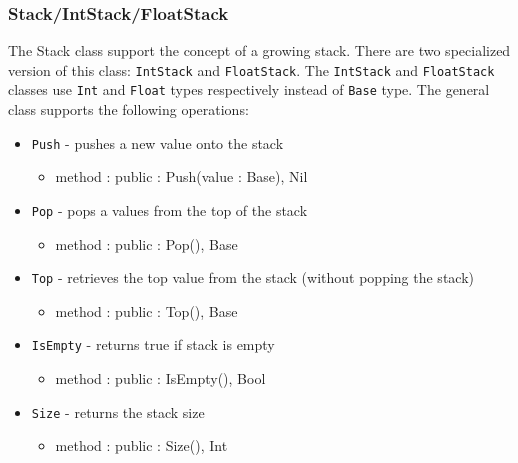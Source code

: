 \documentclass[12pt]{article}
\begin{document}
\subsubsection{Stack/IntStack/FloatStack}
The Stack class support the concept of a growing stack.  There are two specialized version of this class: \texttt{IntStack} and \texttt{FloatStack}.  The \texttt{IntStack} and \texttt{FloatStack} classes use \texttt{Int} and \texttt{Float} types respectively instead of \texttt{Base} type.  The general class supports the following operations:
\begin{itemize}
    \item \texttt{Push} - pushes a new value onto the stack
    	\begin{itemize}
	\item method : public : Push(value : Base), Nil
	\end{itemize}
    \item \texttt{Pop} - pops a values from the top of the stack
    	\begin{itemize}
	\item method : public : Pop(), Base
	\end{itemize}
    \item \texttt{Top} - retrieves the top value from the stack (without popping the stack)
    	\begin{itemize}
	\item method : public : Top(), Base
	\end{itemize}
    \item \texttt{IsEmpty} - returns true if stack is empty
    	\begin{itemize}
	\item method : public : IsEmpty(), Bool
	\end{itemize}
    \item \texttt{Size} - returns the stack size
    	\begin{itemize}
	\item method : public : Size(), Int
	\end{itemize}
\end{itemize}
\end{document}
